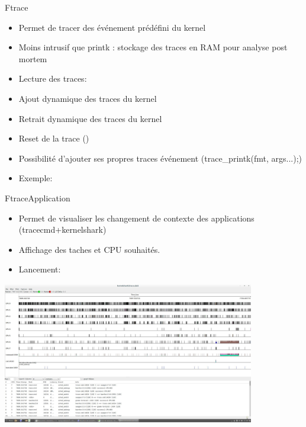 \begin{frame}[allowframebreaks]{Ftrace}
	\begin{itemize}
	 	\item
	 		Permet de tracer des événement prédéfini du kernel
	 	\item
	 		Moins intrusif que printk : stockage des traces en RAM pour analyse post mortem
	 	\item
	 		Lecture des traces:
	 		\readtrace
	 	\item
	 		Ajout dynamique des traces du kernel
	 		\enabletrace
	 	\item
	 		Retrait dynamique des traces du kernel
	 		\disabletrace
	 	\item
	 		Reset de la trace ()
	 		\cleartrace
	 	\item
	 		Possibilité d'ajouter ses propres traces événement (trace\_printk(fmt, args...);)
	 		\addtrace
	 	\item
	 		Exemple:
	 		\nexttrace
	\end{itemize}
\end{frame}


\begin{frame}[allowframebreaks]{Ftrace}{Application}
	\begin{itemize}
	 	\item
	 		Permet de visualiser les changement de contexte des applications (tracecmd+kernelshark)
	 	\item
	 		Affichage des taches et CPU souhaités.
	 	\item
	 		Lancement:
	 		\kshark
	\end{itemize}
	\includegraphics[width=11cm]{kernelshark.jpg}
\end{frame}

